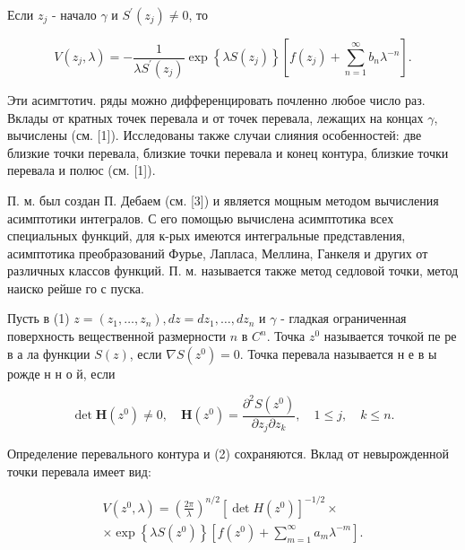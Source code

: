 \documentclass[10pt]{article}
\begin{document}
Если $z_{j}$ - начало $\gamma$ и $S^{\prime}\left(z_{j}\right) \neq 0$, то



\[

V\left(z_{j}, \lambda\right)=-\frac{1}{\lambda S^{\prime}\left(z_{j}\right)} \exp \left\{\lambda S\left(z_{j}\right)\right\}\left[f\left(z_{j}\right)+\sum_{n=1}^{\infty} b_{n} \lambda^{-n}\right] .

\]



Эти асимгтотич. ряды можно дифференцировать почленно любое число раз. Вклады от кратных точек перевала и от точек перевала, лежащих на концах $\gamma$, вычислены (см. [1]). Исследованы также случаи слияния особенностей: две близкие точки перевала, близкие точки перевала и конец контура, близкие точки перевала и полюс (см. [1]).



П. м. был создан П. Дебаем (см. [3]) и является мощным методом вычисления асимптотики интегралов. С его помощью вычислена асимптотика всех специальных функций, для к-рых имеются интегральные представления, асимптотика преобразований Фурье, Лапласа, Меллина, Ганкеля и других от различных классов функций. П. м. называется также метод седловой точки, метод наиско рейше го с пуска.



Пусть в (1) $z=\left(z_{1}, \ldots, z_{n}\right), d z=d z_{1}, \ldots, d z_{n}$ и $\gamma$ - гладкая ограниченная поверхность вещественной размерности $n$ в $C^{n}$. Точка $z^{0}$ называется точкой пе ре в а ла функции $S(z)$, если $\nabla S\left(z^{0}\right)=0$. Точка перевала называется н е в ы рожде н н о й, если



\[

\operatorname{det} \boldsymbol{H}\left(z^{0}\right) \neq 0, \quad \boldsymbol{H}\left(z^{0}\right)=\frac{\partial^{2} S\left(z^{0}\right)}{\partial z_{j} \partial z_{k}}, \quad 1 \leqslant j, \quad k \leqslant n .

\]



Определение перевального контура и (2) сохраняются. Вклад от невырожденной точки перевала имеет вид:



\[

\begin{gathered}

V\left(z^{0}, \lambda\right)=\left(\frac{2 \pi}{\lambda}\right)^{n / 2}\left[\operatorname{det} H\left(z^{0}\right)\right]^{-1 / 2} \times \\

\times \exp \left\{\lambda S\left(z^{0}\right)\right\}\left[f\left(z^{0}\right)+\sum_{m=1}^{\infty} a_{m} \lambda^{-m}\right] .

\end{gathered}

\]
\end{document}
